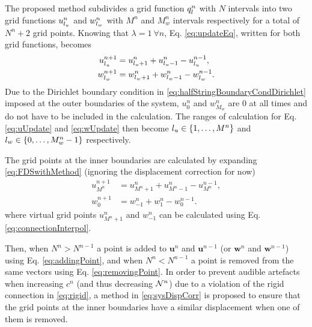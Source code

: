 The proposed method subdivides a grid function $q_l^n$ with $N$ intervals into two grid functions $u_{l_u}^n$ and $w_{l_w}^n$ with $M^n$ and $M_w^n$ intervals respectively for a total of $N^n+2$ grid points. Knowing that $\lambda=1 \ \forall n$, Eq. \eqref{eq:updateEq}, written for both grid functions, becomes 
\begin{subequations}\label{eq:uwUpdates}
    \begin{align}
        u_{l_u}^{n+1} &= u_{{l_u}+1}^n + u_{{l_u}-1}^n - u_{l_u}^{n-1},\label{eq:uUpdate}\\
        w_{l_w}^{n+1} &= w_{{l_w}+1}^n + w_{{l_w}-1}^n - w_{l_w}^{n-1}\label{eq:wUpdate}.
    \end{align}
\end{subequations}
%
Due to the Dirichlet boundary condition in \eqref{eq:halfStringBoundaryCondDirichlet} imposed at the outer boundaries of the system, $u_0^n$ and $w_{M_w}^n$ are $0$ at all times and do not have to be included in the calculation. The ranges of calculation for Eq. \eqref{eq:uUpdate} and \eqref{eq:wUpdate} then become ${l_u} \in \{1, \hdots, M^n\}$ and ${l_w} \in \{0, \hdots, M_w^n - 1\}$ respectively. 

The grid points at the inner boundaries are calculated by expanding \eqref{eq:FDSwithMethod} (ignoring the displacement correction for now)
\begin{subequations}\label{eq:innerboundariesExpanded}
    \begin{align}
        u_{M^n}^{n+1} &= u_{{M^n}+1}^n + u_{{M^n}-1}^n - u_{M^n}^{n-1},\\
        w_0^{n+1} &= w_{-1}^n + w_{1}^n - w_0^{n-1}.
    \end{align}
\end{subequations}
%
where virtual grid points $u_{{M^n}+1}^n$ and $w_{-1}^n$ can be calculated using Eq. \eqref{eq:connectionInterpol}.

Then, when $ N^n > N^{n-1}$ a point is added to $\mathbf{u}^n$ and $\mathbf{u}^{n-1}$ (or $\mathbf{w}^n$ and $\mathbf{w}^{n-1}$) using Eq. \eqref{eq:addingPoint}, and when $ N^n  < N^{n-1}$ a point is removed from the same vectors using Eq. \eqref{eq:removingPoint}. In order to prevent audible artefacts when increasing $c^n$ (and thus decreasing $\mathcal{N}^n$) due to a violation of the rigid connection in \eqref{eq:rigid}, a method in \eqref{eq:sysDispCorr} is proposed to ensure that the grid points at the inner boundaries have a similar displacement when one of them is removed. 

